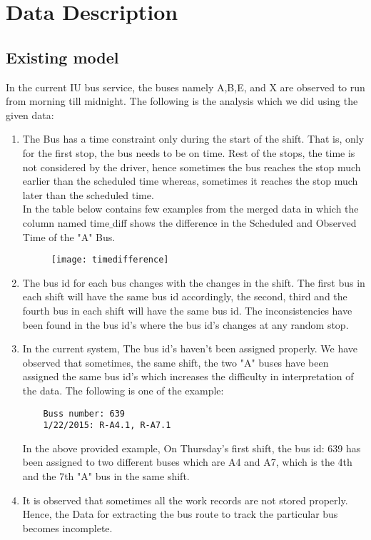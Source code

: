 \documentclass[12pt]{article}
\begin{document}
\section{Data Description}
\subsection{Existing model}
In the current IU bus service, the buses namely A,B,E, and X are observed to run from morning till midnight. The following is the analysis which we did using the given data:
\begin{enumerate}
	\item The Bus has a time constraint only during the start of the shift. That is, only for the first stop, the bus needs to be on time. Rest of the stops, the time is not considered by the driver, hence sometimes the bus reaches the stop much earlier than the scheduled time whereas, sometimes it reaches the stop much later than the scheduled time.
	\\In the table below contains few examples from the merged data in which the column named time$\_$diff shows the difference in the Scheduled and Observed Time of the "A" Bus.
	
		\begin{figure}[ht!]
			\centering
			\texttt{[image: timedifference]}
		\end{figure}
	
	\item The bus id for each bus changes with the changes in the shift. The first bus in each shift will have the same bus id accordingly, the second, third and the fourth bus in each shift will have the same bus id. The inconsistencies have been found in the  bus id's where the bus id's changes at any random stop.
	\item In the current system, The bus id's haven't been assigned properly. We have observed that sometimes, the same shift, the two "A" buses have been assigned the same bus id's which increases the difficulty in interpretation of the data. The following is one of the example:
	\begin{verbatim}
	Buss number: 639
	1/22/2015: R-A4.1, R-A7.1
	\end{verbatim}
		
	In the above provided example, On Thursday's first shift, the bus id: 639 has been assigned to two different buses which are A4 and A7, which is the 4th and the 7th "A" bus in the same shift.
	
	\item It is observed that sometimes all the work records are not stored properly. Hence, the Data for extracting the bus route to track the particular bus becomes incomplete.
	\end{enumerate}
\end{document}
